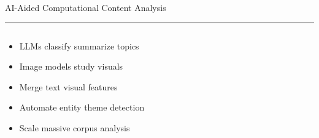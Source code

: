 \documentclass[aspectratio=169]{beamer}
\newcommand{\TitleFont}{\rmfamily}
\begin{document}
\begin{frame}[t]{}
  \vspace*{0.5cm}
  {\TitleFont\fontsize{18}{22}\selectfont\color{LUBronze}AI-Aided Computational Content Analysis\par}
  \vspace{0.3em}
  {\color{LUBronze}\rule{\linewidth}{0.8pt}}\par
  \vspace{0.2cm}
  \begin{columns}[t]
    \begin{column}[t]{0.4\textwidth}
      \vspace*{0pt}
      \begin{itemize}\setlength\itemsep{0.65em}
        \item LLMs classify summarize topics
        \item Image models study visuals
        \item Merge text visual features
        \item Automate entity theme detection
        \item Scale massive corpus analysis
      \end{itemize}
    \end{column}
  \end{columns}
\end{frame}
\end{document}

